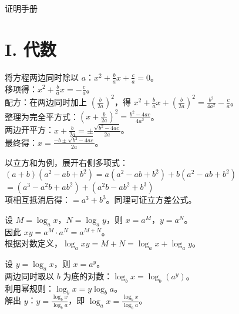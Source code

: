 \pagebreak
\nopagecolor
\begin{center}
  {\fontsize{30pt}{26pt}\selectfont 证明手册}
\end{center}
\separator
\section*{I. 代数}

\begin{questions}

\begin{solution}
    将方程两边同时除以 $a$：$x^{2} + \frac{b}{a}x + \frac{c}{a} = 0$。\\
    移项得：$x^{2} + \frac{b}{a}x = -\frac{c}{a}$。\\
    配方：在两边同时加上 $(\frac{b}{2a})^{2}$，得 $x^{2} + \frac{b}{a}x + (\frac{b}{2a})^{2} = \frac{b^{2}}{4a^{2}} - \frac{c}{a}$。\\
    整理为完全平方式：$(x + \frac{b}{2a})^{2} = \frac{b^{2}-4ac}{4a^{2}}$。\\
    两边开平方：$x + \frac{b}{2a} = \pm \frac{\sqrt{b^{2}-4ac}}{2a}$。\\
    最终得：$x = \frac{-b \pm \sqrt{b^{2}-4ac}}{2a}$。
\end{solution}

\begin{solution}
    以立方和为例，展开右侧多项式：\\
    $(a + b)(a^{2} - ab + b^{2}) = a(a^{2} - ab + b^{2}) + b(a^{2} - ab + b^{2})$ \\
    $= (a^{3} - a^{2}b + ab^{2}) + (a^{2}b - ab^{2} + b^{3})$ \\
    项相互抵消后得：$= a^{3} + b^{3}$。同理可证立方差公式。
\end{solution}

\begin{solution}
    设 $M = \log_{a}x$，$N = \log_{a}y$，则 $x = a^{M}$，$y = a^{N}$。\\
    因此 $xy = a^{M} \cdot a^{N} = a^{M+N}$。\\
    根据对数定义，$\log_{a}xy = M + N = \log_{a}x + \log_{a}y$。
\end{solution}

\begin{solution}
    设 $y = \log_{a}x$，则 $x = a^{y}$。\\
    两边同时取以 $b$ 为底的对数：$\log_{b}x = \log_{b}(a^{y})$。\\
    利用幂规则：$\log_{b}x = y \log_{b}a$。\\
    解出 $y$：$y = \frac{\log_{b}x}{\log_{b}a}$，即 $\log_{a}x = \frac{\log_{b}x}{\log_{b}a}$。
\end{solution}


\end{questions}
